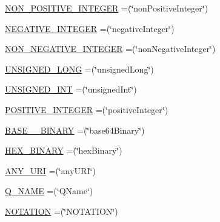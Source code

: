 \begin{DoxyCompactItemize}
\item 
\hyperlink{enumorg_1_1semanticweb_1_1owlapi_1_1vocab_1_1_x_s_d_vocabulary_aadf460c1a0c3baa23b1482c8ce7d4631}{N\-O\-N\-\_\-\-P\-O\-S\-I\-T\-I\-V\-E\-\_\-\-I\-N\-T\-E\-G\-E\-R} =(\char`\"{}non\-Positive\-Integer\char`\"{})
\item 
\hyperlink{enumorg_1_1semanticweb_1_1owlapi_1_1vocab_1_1_x_s_d_vocabulary_a1d4f74b0c7024b649e6fd8e73691fb53}{N\-E\-G\-A\-T\-I\-V\-E\-\_\-\-I\-N\-T\-E\-G\-E\-R} =(\char`\"{}negative\-Integer\char`\"{})
\item 
\hyperlink{enumorg_1_1semanticweb_1_1owlapi_1_1vocab_1_1_x_s_d_vocabulary_acd9ce97bae19edd81ff64e3fd7c9e2a2}{N\-O\-N\-\_\-\-N\-E\-G\-A\-T\-I\-V\-E\-\_\-\-I\-N\-T\-E\-G\-E\-R} =(\char`\"{}non\-Negative\-Integer\char`\"{})
\item 
\hyperlink{enumorg_1_1semanticweb_1_1owlapi_1_1vocab_1_1_x_s_d_vocabulary_a3c305317f4a55b4b8add2aa071d02116}{U\-N\-S\-I\-G\-N\-E\-D\-\_\-\-L\-O\-N\-G} =(\char`\"{}unsigned\-Long\char`\"{})
\item 
\hyperlink{enumorg_1_1semanticweb_1_1owlapi_1_1vocab_1_1_x_s_d_vocabulary_a3465ae6abe740f445eeca9641fc2e39e}{U\-N\-S\-I\-G\-N\-E\-D\-\_\-\-I\-N\-T} =(\char`\"{}unsigned\-Int\char`\"{})
\item 
\hyperlink{enumorg_1_1semanticweb_1_1owlapi_1_1vocab_1_1_x_s_d_vocabulary_a77542bb93b8071f16a009b6e29d02cec}{P\-O\-S\-I\-T\-I\-V\-E\-\_\-\-I\-N\-T\-E\-G\-E\-R} =(\char`\"{}positive\-Integer\char`\"{})
\item 
\hyperlink{enumorg_1_1semanticweb_1_1owlapi_1_1vocab_1_1_x_s_d_vocabulary_a79c331f40cb5e50b91df0739bfced257}{B\-A\-S\-E\-\_\-\_\-\-B\-I\-N\-A\-R\-Y} =(\char`\"{}base64\-Binary\char`\"{})
\item 
\hyperlink{enumorg_1_1semanticweb_1_1owlapi_1_1vocab_1_1_x_s_d_vocabulary_a73a9c3c35111dc94f8d096661a799def}{H\-E\-X\-\_\-\-B\-I\-N\-A\-R\-Y} =(\char`\"{}hex\-Binary\char`\"{})
\item 
\hyperlink{enumorg_1_1semanticweb_1_1owlapi_1_1vocab_1_1_x_s_d_vocabulary_a5e6b3364b1f99ef7ee561c4053c2b024}{A\-N\-Y\-\_\-\-U\-R\-I} =(\char`\"{}any\-U\-R\-I\char`\"{})
\item 
\hyperlink{enumorg_1_1semanticweb_1_1owlapi_1_1vocab_1_1_x_s_d_vocabulary_aca0ce35fff92efa2421978bdbaf922c8}{Q\-\_\-\-N\-A\-M\-E} =(\char`\"{}Q\-Name\char`\"{})
\item 
\hyperlink{enumorg_1_1semanticweb_1_1owlapi_1_1vocab_1_1_x_s_d_vocabulary_aba277a7bcdaf7940997c7ea62a009c82}{N\-O\-T\-A\-T\-I\-O\-N} =(\char`\"{}N\-O\-T\-A\-T\-I\-O\-N\char`\"{})

\end{DoxyCompactItemize}
